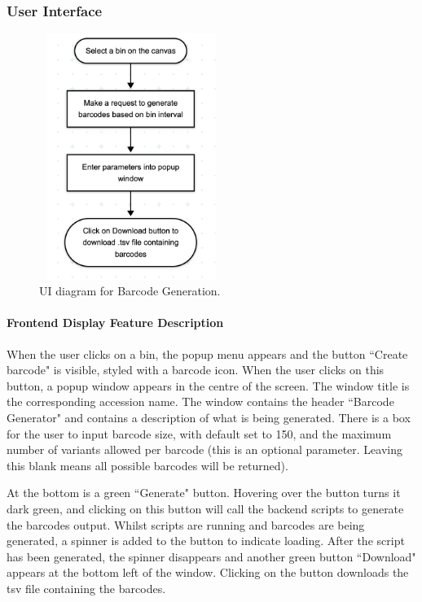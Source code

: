 \documentclass[12pt]{article}
\begin{document}
\subsubsection{User Interface}

\begin{figure}[h]
    \centering
    \includegraphics[width=6cm, height=8cm]{Bar1.png}
    \caption{UI diagram for Barcode Generation.}
\end{figure}


\paragraph{Frontend Display Feature Description}
When the user clicks on a bin, the popup menu appears and the button ``Create barcode" is visible, styled with a barcode icon. When the user clicks on this button, a popup window appears in the centre of the screen. The window title is the corresponding accession name. The window contains the header ``Barcode Generator" and contains a description of what is being generated. There is a box for the user to input barcode size, with default set to 150, and the maximum number of variants allowed per barcode (this is an optional parameter. Leaving this blank means all possible barcodes will be returned).  

At the bottom is a green ``Generate" button. Hovering over the button turns it dark green, and clicking on this button will call the backend scripts to generate the barcodes output. Whilst scripts are running and barcodes are being generated, a spinner is added to the button to indicate loading. After the script has been generated, the spinner disappears and another green button ``Download" appears at the bottom left of the window. Clicking on the button downloads the tsv file containing the barcodes.  
\end{document}

